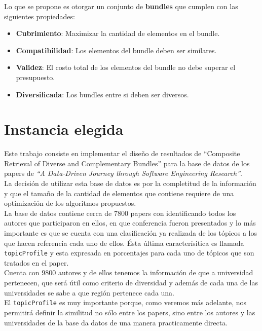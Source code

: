 Lo que se propone es otorgar un conjunto de \textbf{bundles} que cumplen con las siguientes propiedades:
\begin{itemize}
  \item \textbf{Cubrimiento}: Maximizar la cantidad de elementos en el bundle.
  \item \textbf{Compatibilidad}: Los elementos del bundle deben ser similares.
  \item \textbf{Validez}: El costo total de los elementos del bundle no debe superar el presupuesto.
  \item \textbf{Diversificada}: Los bundles entre si deben ser diversos.
\end{itemize}

\section{Instancia elegida}
Este trabajo consiste en implementar el diseño de resultados de ``Composite Retrieval of Diverse and Complementary Bundles'' 
para la base de datos de los papers de \textit{\textquotedblleft A Data-Driven Journey through Software Engineering Research\textquotedblright}\cite{dataDrive}.\\
La decisión de utilizar esta base de datos es por la completitud de la información y que el tamaño de la cantidad de elementos
que contiene requiere de una optimización de los algoritmos propuestos.\\
La base de datos contiene cerca de $7800$ papers con identificando todos los autores que participaron en ellos, en que conferencia fueron presentados y lo más importante es que se cuenta con una clasificación ya realizada de los tópicos a los que hacen referencia cada uno de ellos. Ésta última caracterísitica es llamada \texttt{topicProfile} y esta expresada en porcentajes para cada uno de tópicos que son tratados en el paper.\\
Cuenta con $9800$ autores y de ellos tenemos la información de que a universidad pertenecen, que será útil como criterio de diversidad y además de cada una de las universidades se sabe a que región pertenece cada una.\\
El \texttt{topicProfile} es muy importante porque, como veremos más adelante, nos permitirá definir la similitud no sólo entre los papers, sino entre los autores y las universidades de la base da datos de una manera practicamente directa.